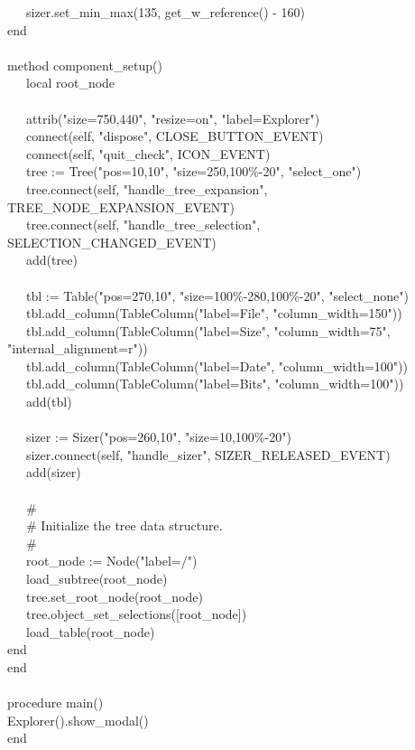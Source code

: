 {\>   \ \ \ sizer.set\_min\_max(135, get\_w\_reference() - 160) \\
\>   end \\
\ \\
\>   method component\_setup() \\
\>   \ \ \ local root\_node \\
\ \\
\>   \ \ \ attrib("size=750,440",
"resize=on",
"label=Explorer") \\
\>   \ \ \ connect(self, "dispose",
CLOSE\_BUTTON\_EVENT) \\
\>   \ \ \ connect(self, "quit\_check",
ICON\_EVENT) \\
\>   \ \ \ tree := Tree("pos=10,10",
"size=250,100\%-20",
"select\_one") \\
\>   \ \ \ tree.connect(self,
"handle\_tree\_expansion",
TREE\_NODE\_EXPANSION\_EVENT) \\
\>   \ \ \ tree.connect(self,
"handle\_tree\_selection",
SELECTION\_CHANGED\_EVENT) \\
\>   \ \ \ add(tree) \\
\ \\
\>   \ \ \ tbl := Table("pos=270,10",
"size=100\%-280,100\%-20",
"select\_none") \\
\>   \ \ \ tbl.add\_column(TableColumn("label=File",
"column\_width=150")) \\
\>   \ \ \ tbl.add\_column(TableColumn("label=Size",
"column\_width=75",
"internal\_alignment=r")) \\
\>   \ \ \ tbl.add\_column(TableColumn("label=Date",
"column\_width=100")) \\
\>   \ \ \ tbl.add\_column(TableColumn("label=Bits",
"column\_width=100")) \\
\>   \ \ \ add(tbl) \\
\ \\
\>   \ \ \ sizer := Sizer("pos=260,10",
"size=10,100\%-20") \\
\>   \ \ \ sizer.connect(self,
"handle\_sizer", SIZER\_RELEASED\_EVENT) \\
\>   \ \ \ add(sizer) \\
\ \\
\>   \ \ \ \# \\
\>   \ \ \ \# Initialize the tree data structure. \\
\>   \ \ \ \# \\
\>   \ \ \ root\_node := Node("label=/") \\
\>   \ \ \ load\_subtree(root\_node) \\
\>   \ \ \ tree.set\_root\_node(root\_node) \\
\>   \ \ \ tree.object\_set\_selections([root\_node]) \\
\>   \ \ \ load\_table(root\_node) \\
\>   end \\
end \\
\ \\
procedure main() \\
\>   Explorer().show\_modal() \\
end
}

